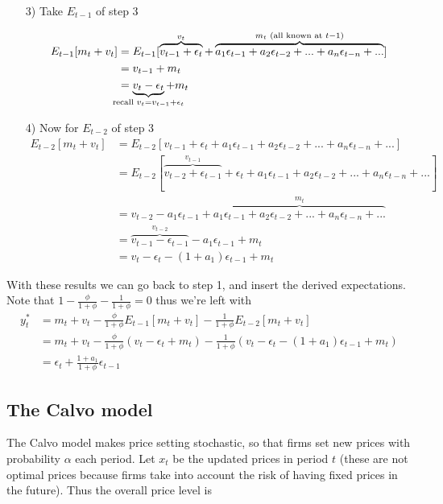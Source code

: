 \documentclass[12pt, a4paper]{article}
\begin{document}
\begin{spacing}{1.213}
\begin{itemize}
\item[3)] Take $E_{t-1}$ of step 3

\begin{align*}
E_{t-1}[m_t + v_t] &= E_{t-1}[\overbrace{v_{t-1} + \epsilon_t}^{v_t} + \overbrace { a_1 \epsilon_{t-1} + a_2 \epsilon_{t-2} + ... + a_{n} \epsilon_{t-n} + ...}^{m_t \textrm{ (all known at }t-1)}] \\
& = v_{t-1} + m_t \\
& = \underbrace{v_t - \epsilon_t}_{\mathclap{\textrm{recall }v_t = v_{t-1} + \epsilon_t }} + m_t
\end{align*}

\item[4)] Now for $E_{t-2}$ of step 3
\begin{align*}
E_{t-2}[m_t + v_t] &= E_{t-2}[v_{t-1} + \epsilon_t +  a_1 \epsilon_{t-1} + a_2 \epsilon_{t-2} + ... + a_{n} \epsilon_{t-n} + ...] \\
& = E_{t-2}[\overbrace{v_{t-2}+ \epsilon_{t-1}}^{v_{t-1}} + \epsilon_t +  a_1 \epsilon_{t-1} + a_2 \epsilon_{t-2} + ... + a_{n} \epsilon_{t-n} + ...] \\
& = v_{t-2} -a_1 \epsilon_{t-1} + \overbrace{a_1 \epsilon_{t-1} + a_2 \epsilon_{t-2} + ... + a_{n} \epsilon_{t-n} + ...}^{m_t} \\
& = \overbrace{v_{t-1} - \epsilon_{t-1}}^{v_{t-2}} -a_1 \epsilon_{t-1} + m_t \\
& = v_t - \epsilon_t - (1+a_1)\epsilon_{t-1} + m_t
\end{align*}
\end{itemize}
With these results we can go back to step 1, and insert the derived expectations. Note that $1- \frac{\phi}{1+\phi}-\frac{1}{1+\phi} = 0$ thus we're left with
\begin{align*}
y_t^* &= m_t + v_t - \frac{\phi}{1+ \phi} E_{t-1}[m_t + v_t] - \frac{1}{1+ \phi} E_{t-2}[m_t + v_t] \\
& = m_t + v_t - \frac{\phi}{1 + \phi}(v_t - \epsilon_t + m_t) - \frac{1}{1+ \phi} (v_t - \epsilon_t - (1+a_1)\epsilon_{t-1} + m_t) \\
& = \epsilon_t + \frac{1+ a_1}{1+ \phi} \epsilon_{t-1}
\end{align*}

\subsection{The Calvo model}
The Calvo model makes price setting stochastic, so that firms set new prices with probability $\alpha$ each period. Let $x_t$ be the updated prices in period $t$ (these are not optimal prices because firms take into account the risk of having fixed prices in the future). Thus the overall price level is


\end{spacing}
\end{document}
